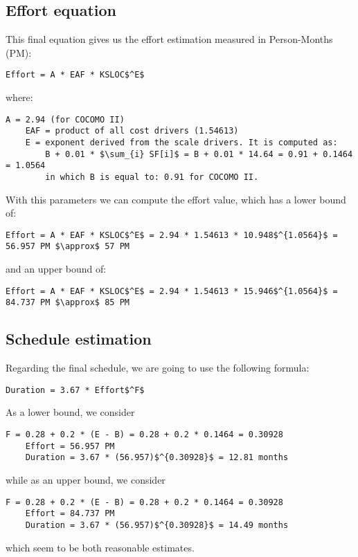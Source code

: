 \subsection{Effort equation}
This final equation gives us the effort estimation measured in Person-Months (PM):
\begin{lstlisting}[mathescape, numbers=none]
	Effort = A * EAF * KSLOC$^E$
\end{lstlisting}
where:
\begin{lstlisting}[mathescape, numbers=none]
	A = 2.94 (for COCOMO II) 
	EAF = product of all cost drivers (1.54613)
	E = exponent derived from the scale drivers. It is computed as:
		B + 0.01 * $\sum_{i} SF[i]$ = B + 0.01 * 14.64 = 0.91 + 0.1464 = 1.0564
		in which B is equal to: 0.91 for COCOMO II.
\end{lstlisting}

With this parameters we can compute the effort value, which has a lower bound of:
\begin{lstlisting}[mathescape, numbers=none]
	Effort = A * EAF * KSLOC$^E$ = 2.94 * 1.54613 * 10.948$^{1.0564}$ = 56.957 PM $\approx$ 57 PM
\end{lstlisting}
and an upper bound of:
\begin{lstlisting}[mathescape, numbers=none]
	Effort = A * EAF * KSLOC$^E$ = 2.94 * 1.54613 * 15.946$^{1.0564}$ = 84.737 PM $\approx$ 85 PM
\end{lstlisting}

\subsection{Schedule estimation}
Regarding the final schedule, we are going to use the following formula:
\begin{lstlisting}[mathescape, numbers=none]
	Duration = 3.67 * Effort$^F$
\end{lstlisting}
As a lower bound, we consider
\begin{lstlisting}[mathescape, numbers=none]
	F = 0.28 + 0.2 * (E - B) = 0.28 + 0.2 * 0.1464 = 0.30928
	Effort = 56.957 PM 
	Duration = 3.67 * (56.957)$^{0.30928}$ = 12.81 months
\end{lstlisting}
while as an upper bound, we consider
\begin{lstlisting}[mathescape, numbers=none]
	F = 0.28 + 0.2 * (E - B) = 0.28 + 0.2 * 0.1464 = 0.30928
	Effort = 84.737 PM 
	Duration = 3.67 * (56.957)$^{0.30928}$ = 14.49 months
\end{lstlisting}
which seem to be both reasonable estimates. 